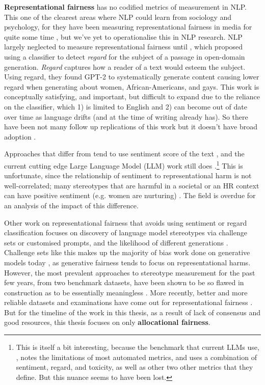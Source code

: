 \textbf{Representational fairness} has no codified metrics of measurement in NLP. This one of the clearest areas where NLP could learn from sociology and psychology, for they have been measuring representational fairness in media for quite some time \citep{dixon2017dangerous, black_rep_bias}, but we've yet to operationalise this in NLP research. NLP largely neglected to measure representational fairness until \citet{sheng-etal-2019-woman}, which proposed using a classifier to detect \textit{regard} for the subject of a passage in open-domain generation. \textit{Regard} captures how a reader of a text would esteem the subject. Using regard, they found GPT-2 \citep{radford2019language} to systematically generate content causing lower regard when generating about women, African-Americans, and gays. This work is conceptually satisfying, and important, but difficult to expand due to the reliance on the classifier, which 1) is limited to English and 2) can become out of date over time as language drifts (and at the time of writing already has). So there have been not many follow up replications of this work but it doesn't have broad adoption \citep{goldfarb-tarrant-etal-2023-prompt}.

Approaches that differ from \citet{sheng-etal-2019-woman} tend to use sentiment score of the text \citep{goldfarb-tarrant-etal-2023-prompt}, and the current cutting edge Large Language Model (LLM) work still does \cite{llama2, jiang2024mixtral}.\footnote{This is itself a bit interesting, because the benchmark that current LLMs use, \citet{Dhamala_2021}, notes the limitations of most automated metrics, and uses a combination of sentiment, regard, and toxicity, as well as other two other metrics that they define. But this nuance seems to have been lost.} This is unfortunate, since the relationship of sentiment to representational harm is not well-correlated; many stereotypes that are harmful in a societal or an HR context can have positive sentiment (e.g. women are nurturing) \citep{fraser-etal-2021-understanding}. The field is overdue for an analysis of the impact of this difference.


Other work on representational fairness that avoids using sentiment or regard classification focuses on discovery of language model stereotypes via challenge sets or customised prompts, and the likelihood of different generations \citep{smith-etal-2022-im}. Challenge sets like this makes up the majority of bias work done on generative models today \citep{goldfarb-tarrant-etal-2023-prompt}, as generative fairness tends to focus on representational harms.
However, the most prevalent approaches to stereotype measurement for the past few years, from two benchmark datasets, have been shown to be so flawed in construction as to be essentially meaningless \citep{blodgett-etal-2021-stereotyping}. More recently, better and more reliable datasets and examinations have come out for representational fairness \citep{esiobu-etal-2023-robbie,  hosseini-etal-2023-empirical, smith-etal-2022-im, Dhamala_2021}. But for the timeline of the work in this thesis, as a result of lack of consensus and good resources, this thesis focuses on only \textbf{allocational fairness}.


